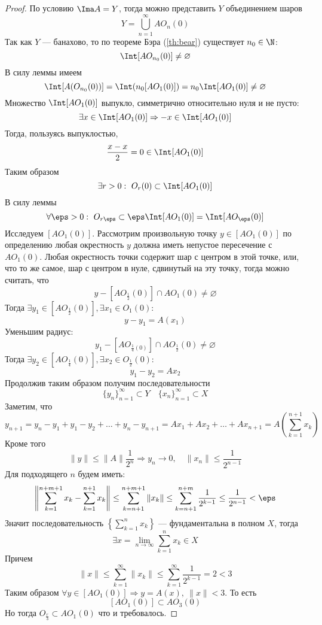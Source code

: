 \begin{proof}
	По условию $\Ima A = Y$, тогда можно представить $Y$ объединением шаров
	$$
	Y = \bigcup_{n=1}^\infty AO_n(0)
	$$
	Так как $Y$ --- банахово, то по теореме Бэра (\ref{th:bear}) существует $n_0 \in \N$: 
	$$
	\Int [AO_{n_0}(0)] \neq \varnothing
	$$
	В силу леммы имеем
	$$
		\Int [A(O_{n_0}(0))] = \Int (n_0 [A O_1(0)]) = n_0 \Int [A O_1(0)] \neq \varnothing
	$$
	Множество $\Int [A O_1(0)]$ выпукло, симметрично относительно нуля и не пусто: 
	$$
	\exists x \in \Int [A O_1(0)] \Rightarrow -x \in \Int [A O_1(0)]
	$$
	Тогда, пользуясь выпуклостью, 
	$$
	\frac{x - x}{2}  = 0 \in \Int [A O_1(0)]
	$$
	Таким образом
	$$
	\exists r > 0:  \ O_r(0) \subset \Int [A O_1(0)] 
	$$
	В силу леммы 
	$$
	\forall \eps > 0 : \ O_{r\eps} \subset \eps \Int [A O_1(0)] = \Int [A O_\eps(0)]
	$$
	Исследуем $[A O_1(0)]$. Рассмотрим произвольную точку $y \in [A O_1(0)]$ по определению любая окрестность $y$ должна иметь непустое пересечение с $A O_1(0)$. Любая окрестность точки содержит шар с центром в этой точке, или, что то же самое, шар с центром в нуле, сдвинутый на эту точку, тогда можно считать, что 
	$$
	y - [A O_{\frac{1}{2}}(0)] \cap AO_1(0) \neq \varnothing
	$$
	Тогда $\exists y_1 \in [A O_\frac{1}{2}(0)], \exists x_1 \in O_1(0)$:
	$$
	y - y_1 = A(x_1)
	$$
	Уменьшим радиус: 
	$$
	y_1 - [A O_{\frac{1}{4}(0)}] \cap AO_\frac{1}{2}(0) \neq \varnothing
	$$
	Тогда $ \exists y_2 \in [A O_\frac{1}{4}(0)], \exists x_2 \in O_\frac{1}{2}(0)$: 
	$$
	y_1 - y_2 = Ax_2
	$$
	Продолжив таким образом получим последовательности 
	$$
	\{y_n\}_{n=1}^\infty \subset Y \quad \{x_n\}_{n=1}^\infty \subset X
	$$
	Заметим, что 
	$$
	y_{n+1} = y_n - y_1 + y_1 - y_2 + \dots + y_n - y_{n+1} = Ax_1 + Ax_2 + \dots + Ax_{n+1} = A\left(\sum_{k=1}^{n+1} x_k\right)
	$$
	Кроме того
	$$
	\|y\| \leq \|A\| \frac{1}{2^n} \Rightarrow y_n \to 0, \quad \|x_n\| \leq \frac{1}{2^{n-1}}
	$$
	Для подходящего $n$ будем иметь:
	$$
	\left\|\sum_{k=1}^{n+m+1}x_k - \sum_{k=1}^{n+1} x_k\right\| \leq \sum_{k=n+1}^{n+m+1} \|x_k\| \leq \sum_{k=n+1}^{n+m} \frac{1}{2^{k-1}}\leq \frac{1}{2^{n-1}} < \eps
	$$
	Значит последовательность $\left\{\sum_{k=1}^n x_k\right\}$ --- фундаментальна в полном $X$, тогда
	$$
	\exists x = \lim\limits_{n \to \infty} \sum_{k=1}^n x_k \in X
	$$
	Причем
	$$
	\|x\| \leq \sum_{k=1}^\infty \|x_k\| \leq \sum_{k=1}^\infty \frac{1}{2^{k-1}} =2 < 3
	$$
	Таким образом $\forall y \in [AO_1(0)] \Rightarrow y = A(x), \ \|x\|  < 3$. То есть
	$$
	[AO_1(0)] \subset AO_3(0)
	$$
	Но тогда $O_\frac{r}{3} \subset AO_1(0)$ что и требовалось.
\end{proof}
